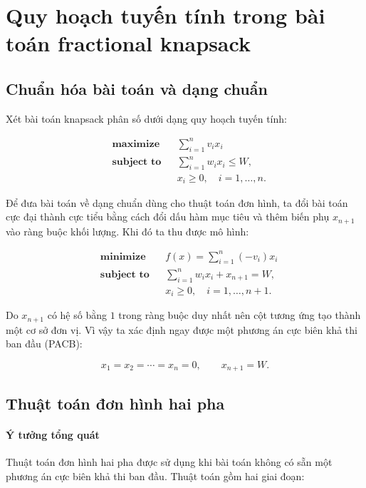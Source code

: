 \documentclass[fontsize=13pt,a4paper]{report}
\begin{document}
\section{Quy hoạch tuyến tính trong bài toán fractional knapsack}

\subsection{Chuẩn hóa bài toán và dạng chuẩn}

Xét bài toán knapsack phân số dưới dạng quy hoạch tuyến tính:

\[
\begin{aligned}
& \textbf{maximize} && \sum_{i=1}^{n} v_i x_i \\
& \textbf{subject to} && \sum_{i=1}^{n} w_i x_i \le W, \\
& && x_i \ge 0,\quad i=1,\dots,n.
\end{aligned}
\]

Để đưa bài toán về dạng chuẩn dùng cho thuật toán đơn hình, ta đổi bài toán cực đại thành cực tiểu bằng cách đổi dấu hàm mục tiêu và thêm biến phụ \(x_{n+1}\) vào ràng buộc khối lượng. Khi đó ta thu được mô hình:

\[
\begin{aligned}
& \textbf{minimize} && f(x)=\sum_{i=1}^{n} (-v_i)x_i \\
& \textbf{subject\ to} && \sum_{i=1}^{n} w_i x_i + x_{n+1}=W, \\
& && x_i \ge 0,\quad i=1,\dots,n+1.
\end{aligned}
\]

Do \(x_{n+1}\) có hệ số bằng \(1\) trong ràng buộc duy nhất nên cột tương ứng tạo thành một cơ sở đơn vị. Vì vậy ta xác định ngay được một phương án cực biên khả thi ban đầu (PACB):

\[
x_1=x_2=\cdots=x_n=0,\qquad x_{n+1}=W.
\]

\subsection{Thuật toán đơn hình hai pha}

\paragraph{Ý tưởng tổng quát}

Thuật toán đơn hình hai pha được sử dụng khi bài toán không có sẵn một phương án cực biên khả thi ban đầu. Thuật toán gồm hai giai đoạn:
\end{document}
